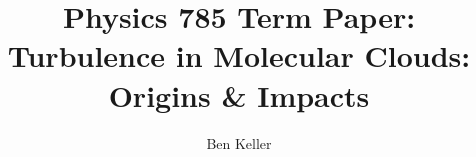 \documentclass[12pt,usenatbib]{article}
\begin{document}
\title{Physics 785 Term Paper: Turbulence in Molecular Clouds: Origins \&
Impacts}
\author{Ben Keller}
\maketitle
\newpage


\end{document}
